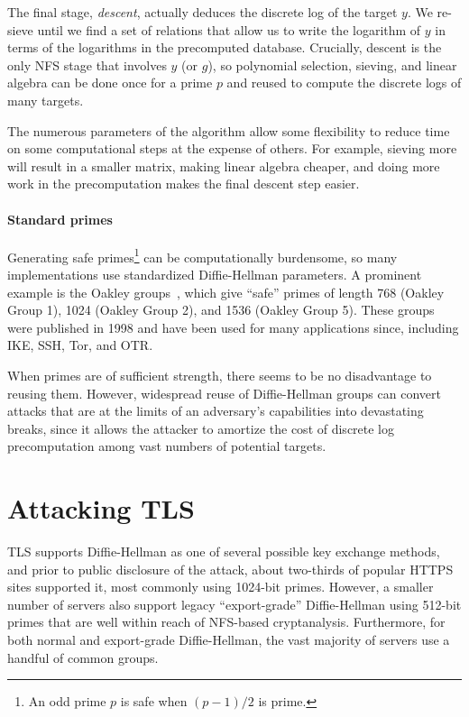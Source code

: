 The final stage, \emph{descent}, actually deduces the discrete log of the
target $y$. We re-sieve until we find a set of relations that allow us to
write the logarithm of $y$ in terms of the logarithms in the precomputed
database. Crucially, descent is the only NFS stage that involves $y$ (or
$g$), so polynomial selection, sieving, and linear algebra can be done once
for a prime $p$ and reused to compute the discrete logs of many targets.

The numerous parameters of the algorithm allow some flexibility to reduce
time on some computational steps at the expense of others. For example,
sieving more will result in a smaller matrix, making linear algebra cheaper,
and doing more work in the precomputation makes the final descent step
easier.

\paragraph{Standard primes}
Generating safe primes\footnote{\small An odd prime $p$ is safe when
$(p-1)/2$ is prime.} can be computationally burdensome, so many
implementations use standardized Diffie-Hellman parameters. A prominent
example is the Oakley groups~\cite{rfc2412}, which give ``safe'' primes of
length 768 (Oakley Group 1), 1024 (Oakley Group 2), and 1536 (Oakley Group
5). These groups were published in 1998 and have been used for many
applications since, including IKE, SSH, Tor, and OTR\@.

When primes are of sufficient strength, there seems to be no
disadvantage to reusing them.  However, widespread reuse of
Diffie-Hellman groups can convert attacks that are at the limits of an
adversary's capabilities into devastating breaks, since it allows the
attacker to amortize the cost of discrete log precomputation among
vast numbers of potential targets.

\section{Attacking TLS}
\label{sec:attacking-tls}

TLS supports Diffie-Hellman as one of several possible key exchange
methods, and prior to public disclosure of the attack, about two-thirds of popular HTTPS sites supported it, most
commonly using 1024-bit primes.  However, a smaller number of servers
also support legacy ``export-grade'' Diffie-Hellman using 512-bit
primes that are well within reach of NFS-based
cryptanalysis. Furthermore, for both normal and export-grade
Diffie-Hellman, the vast majority of servers use a handful of common
groups.

